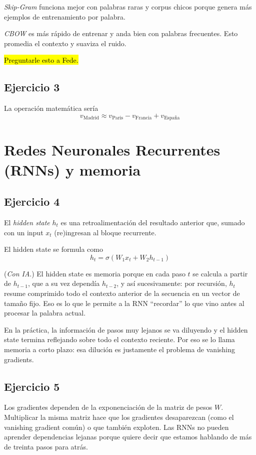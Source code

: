 \documentclass[a4paper,11pt]{article}
\begin{document}
\textit{Skip-Gram} funciona mejor con palabras raras y corpus chicos porque genera más ejemplos de entrenamiento por palabra.

\textit{CBOW} es más rápido de entrenar y anda bien con palabras frecuentes. Esto promedia el contexto y suaviza el ruido.

\hl{Preguntarle esto a Fede.}
\subsection*{Ejercicio 3}
La operación matemática sería $$v_{\text{Madrid}} \approx v_{\text{Paris}} - v_{\text{Francia}} + v_{\text{España}}$$

\section*{Redes Neuronales Recurrentes (RNNs) y memoria}
\subsection*{Ejercicio 4}
El \textit{hidden state} $h_{t}$ es una retroalimentación del resultado anterior que, sumado con un input $x_{t}$ (re)ingresan al bloque recurrente.

El hidden state se formula como $$h_{t} = \sigma(W_{1}x_{t} + W_{2}h_{t-1})$$

(\textit{Con IA}.) El hidden state es memoria porque en cada paso $t$ se calcula a partir de $h_{t-1}$, que a su vez dependía $h_{t-2}$, y así sucesivamente: por recursión, $h_t$ resume comprimido todo el contexto anterior de la secuencia en un vector de tamaño fijo. Eso es lo que le permite a la RNN ``recordar'' lo que vino antes al procesar la palabra actual.

En la práctica, la información de pasos muy lejanos se va diluyendo y el hidden state termina reflejando sobre todo el contexto reciente. Por eso se lo llama memoria a corto plazo: esa dilución es justamente el problema de vanishing gradients.
\subsection*{Ejercicio 5}
Los gradientes dependen de la exponenciación de la matriz de pesos $W$. Multiplicar la misma matriz hace que los gradientes desaparezcan (como el vanishing gradient común) o que también exploten. Las RNNs no pueden aprender dependencias lejanas porque quiere decir que estamos hablando de más de treinta pasos para atrás.
\end{document}
